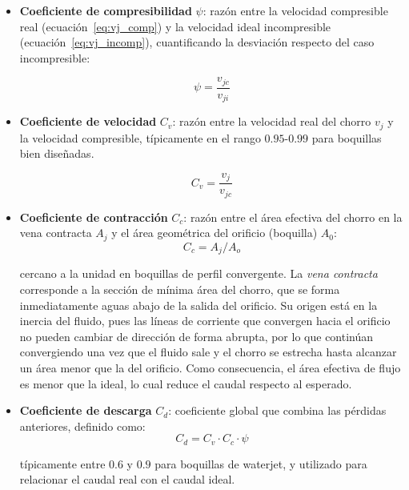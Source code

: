 \begin{itemize}
	\item \textbf{Coeficiente de compresibilidad} $\psi$: razón entre la velocidad compresible real (ecuación~\eqref{eq:vj_comp}) y la velocidad ideal incompresible (ecuación~\eqref{eq:vj_incomp}), cuantificando la desviación respecto del caso incompresible:
	
	\begin{equation}
		\psi = \frac{v_{jc}}{v_{ji}}
	\end{equation}
	
	\item \textbf{Coeficiente de velocidad} $C_v$: razón entre la velocidad real del chorro $v_{j}$  y la velocidad compresible, típicamente en el rango $0.95$-$0.99$ para boquillas bien diseñadas.
	
	\begin{equation}
		C_{v}=\frac{v_{j}}{v_{jc}}
	\end{equation}
	
	\item \textbf{Coeficiente de contracción} $C_c$: razón entre el área efectiva del chorro en la vena contracta $A_{j}$ y el área geométrica del orificio (boquilla) $A_{0}$: 
	\begin{equation}
		C_c = A_{j}/A_{o}
	\end{equation} 
	
	cercano a la unidad en boquillas de perfil convergente. La \textit{vena contracta} corresponde a la sección de mínima área del chorro, que se forma inmediatamente aguas abajo de la salida del orificio. Su origen está en la inercia del fluido, pues las líneas de corriente que convergen hacia el orificio no pueden cambiar de dirección de forma abrupta, por lo que continúan convergiendo una vez que el fluido sale y el chorro se estrecha hasta alcanzar un área menor que la del orificio. Como consecuencia, el área efectiva de flujo es menor que la ideal, lo cual reduce el caudal respecto al esperado.
	
	\item \textbf{Coeficiente de descarga} $C_d$: coeficiente global que combina las pérdidas anteriores, definido como:
	\begin{equation}
		C_d = C_v \cdot C_c \cdot \psi
	\end{equation}
	
	típicamente entre $0.6$ y $0.9$ para boquillas de waterjet, y utilizado para relacionar el caudal real con el caudal ideal.
\end{itemize}


